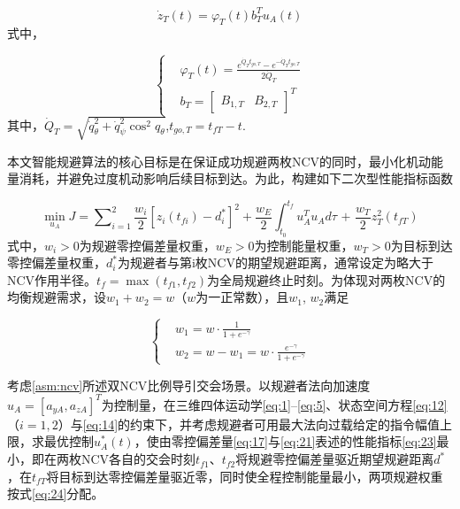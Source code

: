 \begin{equation}
\label{eq:21}
{\dot z_T}(t) = {\varphi _T}(t)b_T^T{u_A}(t)
\end{equation}
式中，

\begin{equation}
\label{eq:22}
\left\{
\begin{aligned}
& {\varphi _T}(t) = \frac{{{e^{{{\dot Q}_T}{t_{go,T}}}} - {e^{ - {{\dot Q}_T}{t_{go,T}}}}}}{{2{{\dot Q}_T}}} \\
& {b_T} = {\left[ {\begin{array}{*{20}{c}}
  {{B_{1,T}}}&{{B_{2,T}}}
\end{array}} \right]^T}
\end{aligned}
\right.
\end{equation}
其中，${\dot Q_T} = \sqrt {\dot q_\theta ^2 + \dot q_\psi ^2{{\cos }^2}{q_\theta }} $,${t_{go,T}} = {t_{fT}} - t$.

本文智能规避算法的核心目标是在保证成功规避两枚NCV的同时，最小化机动能量消耗，并避免过度机动影响后续目标到达。为此，构建如下二次型性能指标函数

\begin{equation}
\label{eq:23}
\mathop {\min }\limits_{{u_A}} J = \sum\nolimits_{i = 1}^2 {\frac{{{w_i}}}{2}{{\left[ {z_i\left( {{t_{fi}}} \right) - d_i^*} \right]}^2}}  + \frac{{{w_E}}}{2}\int_{{t_0}}^{{t_f}} {u_A^T{u_A}d\tau {\text{ + }}\frac{{{w_T}}}{2}z_T^2\left( {{t_{fT}}} \right)}
\end{equation}
式中，${w_i} > 0$为规避零控偏差量权重，${w_E} > 0$为控制能量权重，${w_T} > 0$为目标到达零控偏差量权重，$d_i^*$为规避者与第i枚NCV的期望规避距离，通常设定为略大于NCV作用半径。${t_f} = \max ({t_{f1}},{t_{f2}})$为全局规避终止时刻。为体现对两枚NCV的均衡规避需求，设${w_1} + {w_2} = w$（$w$为一正常数），且${w_1}$, ${w_2}$满足

\begin{equation}
\label{eq:24}
\left\{
\begin{aligned}
& {w_1} = w \cdot \frac{1}{{1 + {e^{ - \gamma }}}} \\
& {w_2} = w - {w_1} = w \cdot \frac{{{e^{ - \gamma }}}}{{1 + {e^{ - \gamma }}}}
\end{aligned}
\right.
\end{equation}
\begin{problem}[一体化最优规避与制导]
\label{prb:integrated}
考虑\cref{asm:ncv}所述双NCV比例导引交会场景。以规避者法向加速度${u_A} = {[{a_{yA}},{a_{zA}}]^T}$为控制量，在三维四体运动学\eqref{eq:1}--\eqref{eq:5}、状态空间方程\eqref{eq:12}（$i = 1,2$）与\eqref{eq:14}的约束下，并考虑规避者可用最大法向过载给定的指令幅值上限，求最优控制$u_A^*(t)$，使由零控偏差量\eqref{eq:17}与\eqref{eq:21}表述的性能指标\eqref{eq:23}最小，即在两枚NCV各自的交会时刻${t_{f1}}$、${t_{f2}}$将规避零控偏差量驱近期望规避距离$d^*$，在${t_{fT}}$将目标到达零控偏差量驱近零，同时使全程控制能量最小，两项规避权重按式\eqref{eq:24}分配。
\end{problem}

